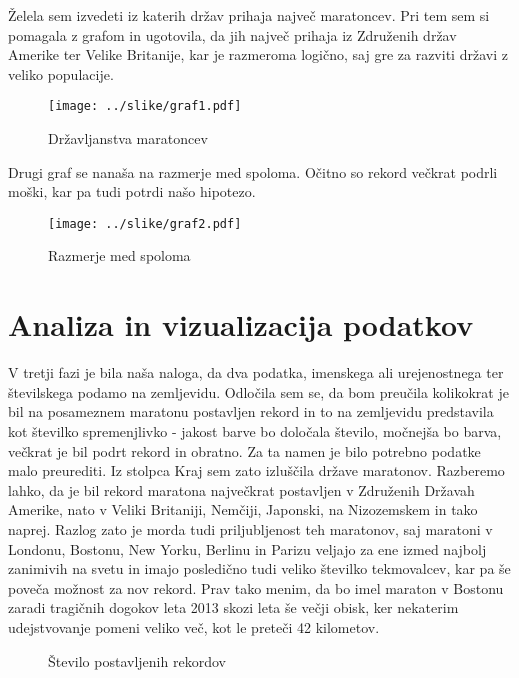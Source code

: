 \documentclass[11pt,a4paper]{article}
\begin{document}
Želela sem izvedeti iz katerih držav prihaja največ maratoncev. Pri tem sem si pomagala z grafom in ugotovila, da jih največ prihaja iz Združenih držav Amerike ter Velike Britanije, kar je razmeroma logično, saj gre za razviti državi z veliko populacije. 

\begin{figure}[H]
  \texttt{[image: ../slike/graf1.pdf]}
  \caption{Državljanstva maratoncev}
  \label{fig:Slika 1}
\end{figure}


Drugi graf se nanaša na razmerje med spoloma. Očitno so rekord večkrat podrli moški, kar pa tudi potrdi našo hipotezo. 

\begin{figure}[H]
  \texttt{[image: ../slike/graf2.pdf]}
  \caption{Razmerje med spoloma}
  \label{fig:Slika 2}
\end{figure}

\newpage
\section{Analiza in vizualizacija podatkov}

V tretji fazi je bila naša naloga, da dva podatka, imenskega ali urejenostnega ter številskega podamo na zemljevidu. 
Odločila sem se, da bom preučila kolikokrat je bil na posameznem maratonu postavljen rekord in to na zemljevidu predstavila kot številko spremenjlivko - jakost barve bo določala število, močnejša bo barva, večkrat je bil podrt rekord in obratno. Za ta namen je bilo potrebno podatke malo preurediti. Iz stolpca Kraj sem zato izluščila države maratonov. 
Razberemo lahko, da je bil rekord maratona največkrat postavljen v Združenih Državah Amerike, nato v Veliki Britaniji, Nemčiji, Japonski, na Nizozemskem in tako naprej. Razlog zato je morda tudi priljubljenost teh maratonov, saj maratoni v Londonu, Bostonu, New Yorku, Berlinu in Parizu veljajo za ene izmed najbolj zanimivih na svetu in imajo posledično tudi veliko številko tekmovalcev, kar pa še poveča možnost za nov rekord. Prav tako menim, da bo imel maraton v Bostonu zaradi tragičnih dogokov leta 2013 skozi leta še večji obisk, ker nekaterim udejstvovanje pomeni veliko več, kot le preteči 42 kilometov.

\begin{figure}[H]
  \caption{Število postavljenih rekordov}
  \label{fig:Zemljevid 1}
\end{figure}
\end{document}
